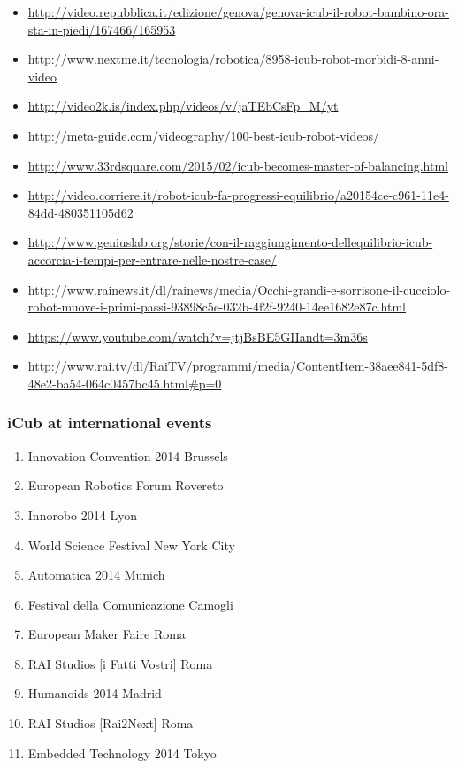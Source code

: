 \begin{itemize}

\item \url{http://video.repubblica.it/edizione/genova/genova-icub-il-robot-bambino-ora-sta-in-piedi/167466/165953}

\item \url{http://www.nextme.it/tecnologia/robotica/8958-icub-robot-morbidi-8-anni-video}

\item \url{http://video2k.is/index.php/videos/v/jaTEbCsFp_M/yt}

\item \url{http://meta-guide.com/videography/100-best-icub-robot-videos/}

\item \url{http://www.33rdsquare.com/2015/02/icub-becomes-master-of-balancing.html}

\item \url{http://video.corriere.it/robot-icub-fa-progressi-equilibrio/a20154ce-c961-11e4-84dd-480351105d62}

\item \url{http://www.geniuslab.org/storie/con-il-raggiungimento-dellequilibrio-icub-accorcia-i-tempi-per-entrare-nelle-nostre-case/}

\item \url{http://www.rainews.it/dl/rainews/media/Occhi-grandi-e-sorrisone-il-cucciolo-robot-muove-i-primi-passi-93898c5e-032b-4f2f-9240-14ee1682e87c.html}

\item \url{https://www.youtube.com/watch?v=jtjBsBE5GIIandt=3m36s}

\item \url{http://www.rai.tv/dl/RaiTV/programmi/media/ContentItem-38aee841-5df8-48e2-ba54-064c0457bc45.html#p=0}
\end{itemize}

\subsubsection{iCub at international events}

\begin{enumerate}

\item Innovation Convention 2014 Brussels
\item European Robotics Forum Rovereto
\item Innorobo 2014 Lyon
\item World Science Festival New York City
\item Automatica 2014 Munich
\item Festival della Comunicazione Camogli
\item European Maker Faire Roma
\item RAI Studios [i Fatti Vostri] Roma
\item Humanoids 2014 Madrid
\item RAI Studios [Rai2Next] Roma
\item Embedded Technology 2014 Tokyo

\end{enumerate}

